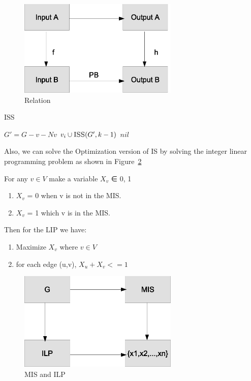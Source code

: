 \documentclass[usletter]{article}
\begin{document}
\begin{figure}[bht]
\begin{center}
     \includegraphics[width=3.0in]{figures/reduction}
\caption{\label{fig:relation}Relation}
\end{center}
\end{figure}

\begin{algorithm}
\caption{ISS}
\begin{algorithmic}[1]
	\State $G' = G - {v} - N{v}$
		\State \Return $v_{i} \cup \Call {ISS}{G', k-1}$
	\EndIf
\EndFor
\State \Return $nil$
\EndProcedure
\end{algorithmic}
\end{algorithm}


Also, we can solve the Optimization version of IS by solving the integer linear programming problem as shown in Figure~\ref{fig:optimization}

For any $v \in V$ make a variable $X_v$ ∈ {0, 1}
\begin{enumerate}
	\item $X_v$ = 0 when v is not in the MIS.
	\item $X_v$ = 1 which v is in the MIS.
\end{enumerate}

Then for the LIP we have:
\begin{enumerate}
	\item Maximize $X_v$ where $v \in V$
	\item for each edge (u,v), $X_u + X_v <= 1$
\end{enumerate}

\begin{figure}[bht]
\begin{center}
     \includegraphics[width=3.0in]{figures/optimization}
\caption{\label{fig:optimization}MIS and ILP}
\end{center}
\end{figure}
\end{document}
